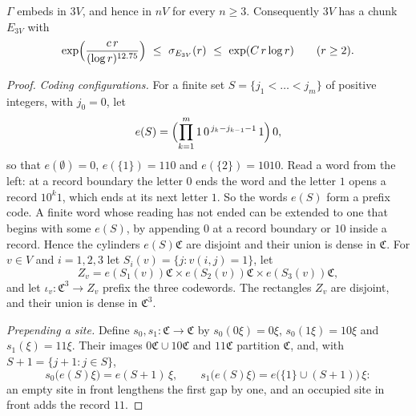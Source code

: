 \begin{proposition}[Embedding in $3V$]\label{prop:3V}
$\Gamma$ embeds in $3V$, and hence in $nV$ for every $n\ge3$. Consequently $3V$ has a chunk $E_{3V}$ with
\[
\exp\Bigl(\frac{c\,r}{(\log r)^{12.75}}\Bigr)\ \le\ \sigma_{E_{3V}}(r)\ \le\ \exp(C\,r\log r)\qquad(r\ge2).
\]
\end{proposition}

\begin{proof}
\emph{Coding configurations.} For a finite set $S=\{j_1<\dots<j_m\}$ of positive integers, with $j_0=0$, let
\[
e(S)=\Bigl(\prod_{k=1}^m1\,0^{\,j_k-j_{k-1}-1}\,1\Bigr)\,0,
\]
so that $e(\emptyset)=0$, $e(\{1\})=110$ and $e(\{2\})=1010$. Read a word from the left: at a record boundary the letter $0$ ends the word and the
letter $1$ opens a record $10^k1$, which ends at its next letter $1$. So the words $e(S)$ form a prefix code. A finite word whose reading has not
ended can be extended to one that begins with some $e(S)$, by appending $0$ at a record boundary or $10$ inside a record. Hence the cylinders
$e(S)\mathfrak C$ are disjoint and their union is dense in $\mathfrak C$. For $v\in V$ and $i=1,2,3$ let $S_i(v)=\{j:v(i,j)=1\}$, let
\[
Z_v=e(S_1(v))\mathfrak C\times e(S_2(v))\mathfrak C\times e(S_3(v))\mathfrak C ,
\]
and let $\iota_v:\mathfrak C^3\to Z_v$ prefix the three codewords. The rectangles $Z_v$ are disjoint, and their union is dense in $\mathfrak C^3$.

\emph{Prepending a site.} Define $s_0,s_1:\mathfrak C\to\mathfrak C$ by $s_0(0\xi)=0\xi$, $s_0(1\xi)=10\xi$ and $s_1(\xi)=11\xi$. Their images
$0\mathfrak C\cup10\mathfrak C$ and $11\mathfrak C$ partition $\mathfrak C$, and, with $S+1=\{j+1:j\in S\}$,
\begin{equation}\label{eq:prepend}
s_0\bigl(e(S)\xi\bigr)=e(S+1)\,\xi,\qquad s_1\bigl(e(S)\xi\bigr)=e\bigl(\{1\}\cup(S+1)\bigr)\,\xi :
\end{equation}
an empty site in front lengthens the first gap by one, and an occupied site in front adds the record $11$.


\end{proof}
